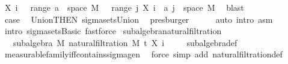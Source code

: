\begin{isabellebody}
\ {\isachardoublequoteopen}X\ i\ {\isacharminus}{\kern0pt}{\isacharbackquote}{\kern0pt}\ {\isasymUnion}\ {\isacharparenleft}{\kern0pt}range\ a{\isacharparenright}{\kern0pt}\ {\isasyminter}\ space\ M\ {\isacharequal}{\kern0pt}\ {\isasymUnion}\ {\isacharparenleft}{\kern0pt}range\ {\isacharparenleft}{\kern0pt}{\isasymlambda}j{\isachardot}{\kern0pt}\ X\ i\ {\isacharminus}{\kern0pt}{\isacharbackquote}{\kern0pt}\ a\ j\ {\isasyminter}\ space\ M{\isacharparenright}{\kern0pt}{\isacharparenright}{\kern0pt}{\isachardoublequoteclose}\ \isamarkupfalse%
\ blast\isanewline
\ \ \ \ \ \ \isamarkupfalse%
\ \isamarkupfalse%
\ {\isacharquery}{\kern0pt}case\ \isamarkupfalse%
\ Union{\isacharparenleft}{\kern0pt}{}{\isacharparenright}{\kern0pt}{\isacharbrackleft}{\kern0pt}THEN\ sigma{\isacharunderscore}{\kern0pt}sets{\isachardot}{\kern0pt}Union{\isacharbrackright}{\kern0pt}\ \isamarkupfalse%
\ presburger\isanewline
\ \ \ \ \isamarkupfalse%
\ {\isacharparenleft}{\kern0pt}auto\ intro{\isacharcolon}{\kern0pt}\ asm{\isacharparenright}{\kern0pt}\isanewline
\ \ \isamarkupfalse%
\ {\isacharparenleft}{\kern0pt}intro\ sigma{\isacharunderscore}{\kern0pt}sets{\isachardot}{\kern0pt}Basic{\isacharcomma}{\kern0pt}\ fastforce{\isacharparenright}{\kern0pt}\isanewline
{}\isamarkupfalse%
%
\endisatagproof
{\isafoldproof}%
%
\isadelimproof
\isanewline
%
\endisadelimproof
\isanewline
{}\isamarkupfalse%
\ subalgebra{\isacharunderscore}{\kern0pt}natural{\isacharunderscore}{\kern0pt}filtration{\isacharcolon}{\kern0pt}\ \isanewline
\ \ \ {\isachardoublequoteopen}subalgebra\ M\ {\isacharparenleft}{\kern0pt}natural{\isacharunderscore}{\kern0pt}filtration\ M\ t\ X\ i{\isacharparenright}{\kern0pt}{\isachardoublequoteclose}\ \isanewline
%
\isadelimproof
\ \ %
\endisadelimproof
%
\isatagproof
{}\isamarkupfalse%
\ subalgebra{\isacharunderscore}{\kern0pt}def\ \isamarkupfalse%
\ measurable{\isacharunderscore}{\kern0pt}family{\isacharunderscore}{\kern0pt}iff{\isacharunderscore}{\kern0pt}contains{\isacharunderscore}{\kern0pt}sigma{\isacharunderscore}{\kern0pt}gen\ \isamarkupfalse%
\ {\isacharparenleft}{\kern0pt}force\ simp\ add{\isacharcolon}{\kern0pt}\ natural{\isacharunderscore}{\kern0pt}filtration{\isacharunderscore}{\kern0pt}def{\isacharparenright}{\kern0pt}%
\endisatagproof
{\isafoldproof}%
%
\isadelimproof
\isanewline
%
\endisadelimproof
\isanewline
{}\isamarkupfalse%

\end{isabellebody}
